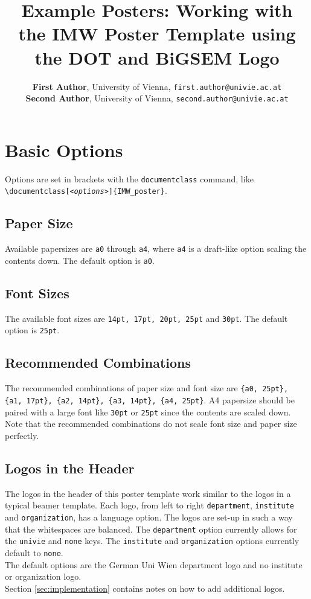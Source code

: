 \documentclass{IMW_poster}
\title{Example Posters: Working with the IMW Poster Template using the DOT and BiGSEM Logo}
\author{
    \textbf{First Author}, University of Vienna, 
    \texttt{first.author@univie.ac.at}\\
    \textbf{Second Author}, University of Vienna, 
    \texttt{second.author@univie.ac.at}
}
\begin{document}
    


\section{Basic Options}
Options are set in brackets with the \texttt{documentclass} command, like
\texttt{\textbackslash documentclass[{\normalfont\emph{<options>}}]\{IMW\_poster\}}.

\subsection{Paper Size}
Available papersizes are \texttt{a0} through \texttt{a4}, where \texttt{a4} is 
a draft-like option scaling the contents down. The default option is 
\texttt{a0}.

\subsection{Font Sizes}
The available font sizes are \texttt{14pt, 17pt, 20pt, 25pt} and 
\texttt{30pt}. The default option is \texttt{25pt}.

\subsection{Recommended Combinations}
The recommended combinations of paper size and font size are 
\texttt{\{a0, 25pt\}, \{a1, 17pt\}, \{a2, 14pt\}, \{a3, 14pt\},
\{a4, 25pt\}}. A4 papersize should be paired with a large font like
\texttt{30pt} or \texttt{25pt} since the contents are scaled down.\\
Note that the recommended combinations do not scale font size and paper size
perfectly.

\subsection{Logos in the Header}
The logos in the header of this poster template work similar to the logos in
a typical beamer template.
Each logo, from left to right \texttt{department}, \texttt{institute} and
\texttt{organization}, has a language option. The logos are set-up in such a
way that the whitespaces are balanced.
The \texttt{department} option currently allows for the \texttt{univie} and
\texttt{none} keys. The \texttt{institute} and \texttt{organization} options
currently default to \texttt{none}.\\
The default options are the German Uni Wien department logo and no institute
or organization logo.\\
Section \ref{sec:implementation} contains notes on how to add additional logos.
\end{document}
